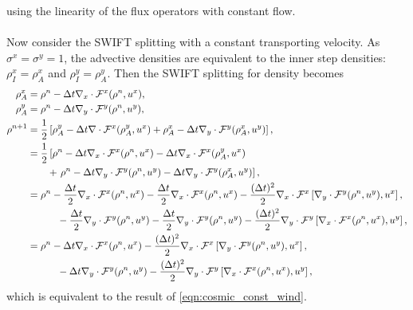 \documentclass[11pt,a4paper]{article}
\begin{document}
using the linearity of the flux operators with constant flow. \\
\\
Now consider the SWIFT splitting with a constant transporting velocity.
As $\sigma^x=\sigma^y=1$, the advective densities are equivalent to the inner step densities: $\rho^x_I=\rho^x_A$ and $\rho^y_I=\rho^y_A$.
Then the SWIFT splitting for density becomes
\begin{subequations} \label{eqn:swift_const_wind}
\begin{align}
\rho_A^x & = \rho^n - \Delta t \nabla_x \cdot \mathcal{F}^x(\rho^n, u^x), \\
\rho_A^y & = \rho^n - \Delta t \nabla_y \cdot \mathcal{F}^y(\rho^n, u^y), \\
\rho^{n+1} & = \frac{1}{2}\left[\rho_A^y - \Delta t \nabla \cdot \mathcal{F}^x(\rho_A^y, u^x) + \rho_A^x - \Delta t \nabla_y \cdot \mathcal{F}^y(\rho_A^x, u^y)\right], \\
& = \frac{1}{2}\left[\rho^n - \Delta t\nabla_x\cdot\mathcal{F}^x(\rho^n,u^x) - \Delta t \nabla_x \cdot \mathcal{F}^x(\rho_A^y, u^x) \right. \\
\notag
& \qquad + \left. \rho^n - \Delta t \nabla_y \cdot \mathcal{F}^y(\rho^n, u^y) - \Delta t \nabla_y \cdot \mathcal{F}^y(\rho_A^x, u^y)\right], \\
& = \rho^n - \frac{\Delta t}{2}\nabla_x\cdot\mathcal{F}^x(\rho^n,u^x) - \frac{\Delta t}{2} \nabla_x \cdot \mathcal{F}^x(\rho^n, u^x) - \frac{(\Delta t)^2}{2}\nabla_x\cdot\mathcal{F}^x\left[\nabla_y\cdot\mathcal{F}^y(\rho^n,u^y),u^x\right], \\
\notag
& \qquad \quad - \frac{\Delta t}{2}\nabla_y\cdot\mathcal{F}^y(\rho^n,u^y) - \frac{\Delta t}{2} \nabla_y \cdot \mathcal{F}^y(\rho^n, u^y) - \frac{(\Delta t)^2}{2}\nabla_y\cdot\mathcal{F}^y\left[\nabla_x\cdot\mathcal{F}^x(\rho^n,u^x),u^y\right], \\
& = \rho^n - \Delta t \nabla_x\cdot\mathcal{F}^x(\rho^n,u^x) - \frac{(\Delta t)^2}{2}\nabla_x\cdot\mathcal{F}^x\left[\nabla_y\cdot\mathcal{F}^y(\rho^n,u^y),u^x\right], \\
\notag
& \qquad \quad -  \Delta t \nabla_y\cdot\mathcal{F}^y(\rho^n,u^y) - \frac{(\Delta t)^2}{2}\nabla_y\cdot\mathcal{F}^y\left[\nabla_x\cdot\mathcal{F}^x(\rho^n,u^x),u^y\right],
\end{align}
\end{subequations}
which is equivalent to the result of \eqref{eqn:cosmic_const_wind}. \\
\\
\end{document}
